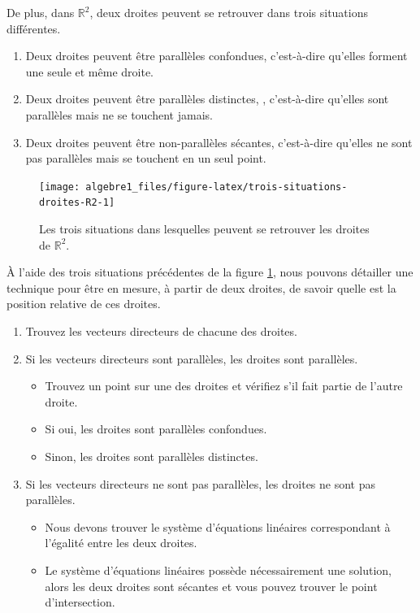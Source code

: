 \documentclass[]{book}
\providecommand{\tightlist}{%
  \setlength{\itemsep}{0pt}\setlength{\parskip}{0pt}}
\theoremstyle{definition}
\theoremstyle{definition}
\theoremstyle{definition}
\theoremstyle{remark}
\begin{document}
De plus, dans \(\mathbb{R}^2\), deux droites peuvent se retrouver dans trois situations différentes.

\begin{enumerate}
\def\labelenumi{\arabic{enumi}.}
\tightlist
\item
  Deux droites peuvent être parallèles confondues, c'est-à-dire qu'elles forment une seule et même droite.
\item
  Deux droites peuvent être parallèles distinctes, , c'est-à-dire qu'elles sont parallèles mais ne se touchent jamais.
\item
  Deux droites peuvent être non-parallèles sécantes, c'est-à-dire qu'elles ne sont pas parallèles mais se touchent en un seul point.
\end{enumerate}

\begin{figure}

{\centering \texttt{[image: algebre1\_files/figure-latex/trois-situations-droites-R2-1]} 

}

\caption{Les trois situations dans lesquelles peuvent se retrouver les droites de $\mathbb{R}^2$.}\label{fig:trois-situations-droites-R2}
\end{figure}

À l'aide des trois situations précédentes de la figure \ref{fig:trois-situations-droites-R2}, nous pouvons détailler une technique pour être en mesure, à partir de deux droites, de savoir quelle est la position relative de ces droites.

\begin{enumerate}
\def\labelenumi{\arabic{enumi}.}
\tightlist
\item
  Trouvez les vecteurs directeurs de chacune des droites.
\item
  Si les vecteurs directeurs sont parallèles, les droites sont parallèles.

  \begin{itemize}
  \tightlist
  \item
    Trouvez un point sur une des droites et vérifiez s'il fait partie de l'autre droite.
  \item
    Si oui, les droites sont parallèles confondues.
  \item
    Sinon, les droites sont parallèles distinctes.
  \end{itemize}
\item
  Si les vecteurs directeurs ne sont pas parallèles, les droites ne sont pas parallèles.

  \begin{itemize}
  \tightlist
  \item
    Nous devons trouver le système d'équations linéaires correspondant à l'égalité entre les deux droites.
  \item
    Le système d'équations linéaires possède nécessairement une solution, alors les deux droites sont sécantes et vous pouvez trouver le point d'intersection.
  \end{itemize}
\end{enumerate}
\end{document}
